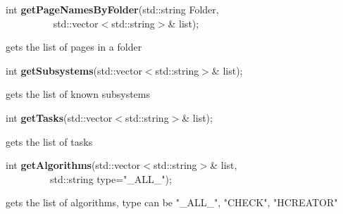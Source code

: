 \item    int {\bf getPageNamesByFolder}(std::string Folder,\\\mbox{}~~~~~~~~~
			   std::vector$<$std::string$>$\& list);

 gets the list of pages in a folder


\item    int {\bf getSubsystems}(std::vector$<$std::string$>$\& list);


 gets the list of known subsystems


\item    int {\bf getTasks}(std::vector$<$std::string$>$\& list);


 gets the list of tasks


\item    int {\bf getAlgorithms}(std::vector$<$std::string$>$\& list,\\\mbox{}~~~~~~~~~std::string type="\_ALL\_");


 gets the list of algorithms, type can be "\_ALL\_", "CHECK", "HCREATOR"



